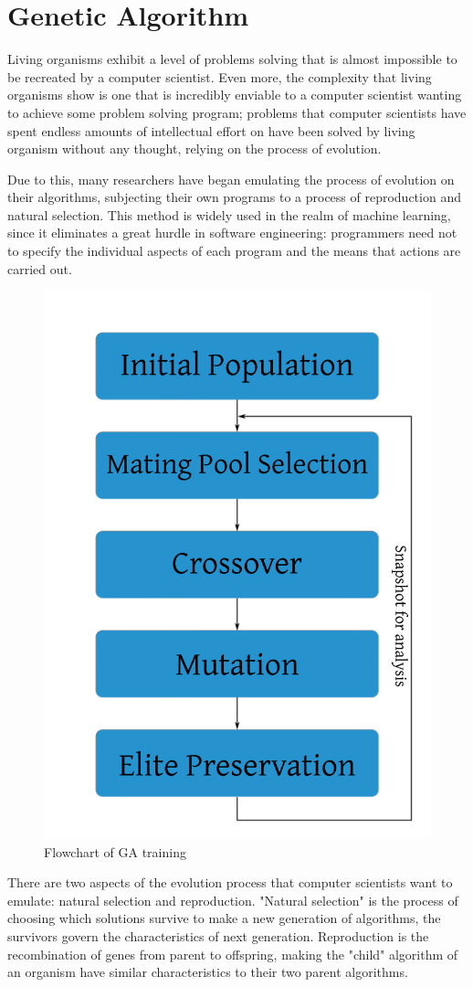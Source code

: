 \documentclass{strrespaper-trad}
\begin{document}
		\section*{Genetic Algorithm}
			Living organisms exhibit a level of problems solving that is almost impossible to be recreated by a computer scientist.
			Even more, the complexity that living organisms show is one that is incredibly enviable to a computer scientist wanting to achieve some problem solving program; problems that computer scientists have spent endless amounts of intellectual effort on have been solved by living organism without any thought, relying on the process of evolution.

			Due to this, many researchers have began emulating the process of evolution on their algorithms, subjecting their own programs to a process of reproduction and natural selection.
			This method is widely used in the realm of machine learning, since it eliminates a great hurdle in software engineering: programmers need not to specify the individual aspects of each program and the means that actions are carried out.

			\begin{figure}
				\centering
				\includegraphics[width=0.6\linewidth]{genetic}
				\caption{Flowchart of GA training}
				\label{fig:genetic}
			\end{figure}

			There are two aspects of the evolution process that computer scientists want to emulate: natural selection and reproduction. "Natural selection" is the process of choosing which solutions survive to make a new generation of algorithms, the survivors govern the characteristics of next generation. Reproduction is the recombination of genes from parent to offspring, making the "child" algorithm of an organism have similar characteristics to their two parent algorithms.
\end{document}
